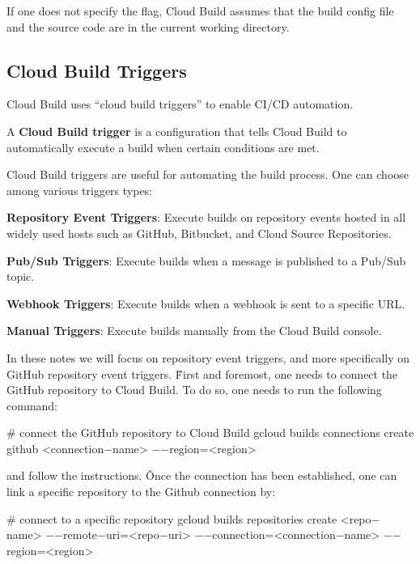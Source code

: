 If one does not specify the  flag, Cloud Build assumes that the build config file and the source code
are in the current working directory.

\subsection{Cloud Build Triggers}\label{subsec:cloud_build_triggers}

Cloud Build uses ``cloud build triggers'' to enable CI/CD automation.

A \textbf{Cloud Build trigger} is a configuration that tells Cloud Build to automatically execute a build when certain
conditions are met.
\ed

Cloud Build triggers are useful for automating the build process. One can choose among various triggers types:
\bit
\item \textbf{Repository Event Triggers}: Execute builds on repository events hosted in all widely used hosts such as
GitHub, Bitbucket, and Cloud Source Repositories.
\item \textbf{Pub/Sub Triggers}: Execute builds when a message is published to a Pub/Sub topic.
\item \textbf{Webhook Triggers}: Execute builds when a webhook is sent to a specific URL\@.
\item \textbf{Manual Triggers}: Execute builds manually from the Cloud Build console.
\eit

In these notes we will focus on repository event triggers, and more specifically on GitHub repository event triggers. \v

First and foremost, one needs to connect the GitHub repository to Cloud Build. To do so, one needs to run the following
command:
\begin{bash}
# connect the GitHub repository to Cloud Build
gcloud builds connections create github <connection$-$name> $-$$-$region=<region>
\end{bash}

and follow the instructions. \v

Once the connection has been established, one can link a specific repository to the Github connection by:
\begin{bash}
# connect to a specific repository
gcloud builds repositories create <repo$-$name>
    $-$$-$remote$-$uri=<repo$-$uri>
    $-$$-$connection=<connection$-$name>
    $-$$-$region=<region>
\end{bash}

